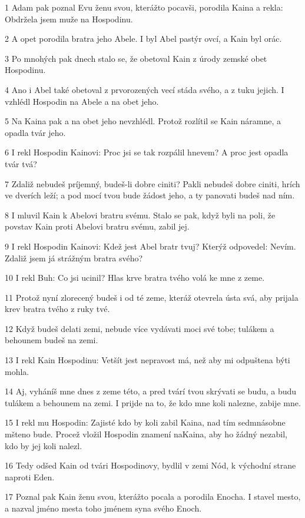 \par 1 Adam pak poznal Evu ženu svou, kterážto pocavši, porodila Kaina a rekla: Obdržela jsem muže na Hospodinu.
\par 2 A opet porodila bratra jeho Abele. I byl Abel pastýr ovcí, a Kain byl orác.
\par 3 Po mnohých pak dnech stalo se, že obetoval Kain z úrody zemské obet Hospodinu.
\par 4 Ano i Abel také obetoval z prvorozených vecí stáda svého, a z tuku jejich. I vzhlédl Hospodin na Abele a na obet jeho.
\par 5 Na Kaina pak a na obet jeho nevzhlédl. Protož rozlítil se Kain náramne, a opadla tvár jeho.
\par 6 I rekl Hospodin Kainovi: Proc jsi se tak rozpálil hnevem? A proc jest opadla tvár tvá?
\par 7 Zdaliž nebudeš príjemný, budeš-li dobre ciniti? Pakli nebudeš dobre ciniti, hrích ve dverích leží; a pod mocí tvou bude žádost jeho, a ty panovati budeš nad ním.
\par 8 I mluvil Kain k Abelovi bratru svému. Stalo se pak, když byli na poli, že povstav Kain proti Abelovi bratru svému, zabil jej.
\par 9 I rekl Hospodin Kainovi: Kdež jest Abel bratr tvuj? Kterýž odpovedel: Nevím. Zdaliž jsem já strážným bratra svého?
\par 10 I rekl Buh: Co jsi ucinil? Hlas krve bratra tvého volá ke mne z zeme.
\par 11 Protož nyní zlorecený budeš i od té zeme, kteráž otevrela ústa svá, aby prijala krev bratra tvého z ruky tvé.
\par 12 Když budeš delati zemi, nebude více vydávati moci své tobe; tulákem a behounem budeš na zemi.
\par 13 I rekl Kain Hospodinu: Vetšít jest nepravost má, než aby mi odpuštena býti mohla.
\par 14 Aj, vyháníš mne dnes z zeme této, a pred tvárí tvou skrývati se budu, a budu tulákem a behounem na zemi. I prijde na to, že kdo mne koli nalezne, zabije mne.
\par 15 I rekl mu Hospodin: Zajisté kdo by koli zabil Kaina, nad tím sedmnásobne mšteno bude. Procež vložil Hospodin znamení naKaina, aby ho žádný nezabil, kdo by jej koli nalezl.
\par 16 Tedy odšed Kain od tvári Hospodinovy, bydlil v zemi Nód, k východní strane naproti Eden.
\par 17 Poznal pak Kain ženu svou, kterážto pocala a porodila Enocha. I stavel mesto, a nazval jméno mesta toho jménem syna svého Enoch.
